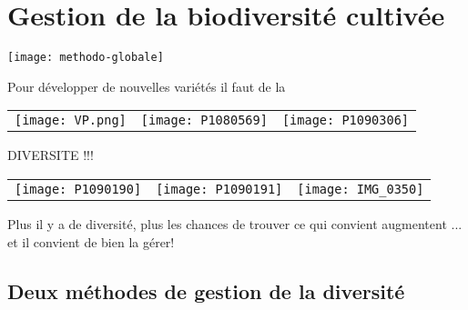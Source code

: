 \section{Gestion de la biodiversité cultivée}
\begin{frame}\tableofcontents[currentsection,currentsubsection,subsectionstyle=show/show/hide]\end{frame}


\begin{frame}
\texttt{[image: methodo-globale]}
\end{frame}

\begin{frame}

Pour développer de nouvelles variétés il faut de la 

\begin{tabular} {p{} p{} p{}} 
\texttt{[image: VP.png]} & \texttt{[image: P1080569]} & \texttt{[image: P1090306]} \\
\end{tabular}

\begin{block}{}
\Huge\centering DIVERSITE !!!
\end{block}

\begin{tabular} {p{} p{} p{}} 
\texttt{[image: P1090190]} & \texttt{[image: P1090191]} & \texttt{[image: IMG\_0350]} \\
\end{tabular}

Plus il y a de diversité, plus les chances de trouver ce qui convient augmentent ... et il convient de bien la gérer!

\end{frame}


\subsection{Deux méthodes de gestion de la diversité}

